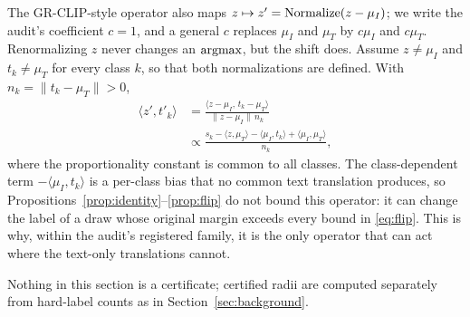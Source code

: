 \begin{remark}
\label{rem:twosided}
The GR-CLIP-style operator also maps $z\mapsto z'=\operatorname{Normalize}(z-\mu_I)$; we write the
audit's coefficient $c=1$, and a general $c$ replaces $\mu_I$ and $\mu_T$ by $c\mu_I$ and $c\mu_T$.
Renormalizing $z$ never changes an $\operatorname{argmax}$, but the shift does. Assume
$z\neq\mu_I$ and $t_k\neq\mu_T$ for every class $k$, so that both
normalizations are defined. With $n_k=\lVert t_k-\mu_T\rVert>0$,
\begin{align}
\langle z',t'_k\rangle
&=\frac{\langle z-\mu_I,\,t_k-\mu_T\rangle}{\lVert z-\mu_I\rVert\,n_k}
\nonumber\\
&\propto
\frac{s_k-\langle z,\mu_T\rangle-\langle\mu_I,t_k\rangle+\langle\mu_I,\mu_T\rangle}{n_k},
\label{eq:twosided}
\end{align}
where the proportionality constant is common to all classes. The
class-dependent term $-\langle\mu_I,t_k\rangle$ is a per-class bias that no
common text translation produces, so
Propositions~\ref{prop:identity}--\ref{prop:flip} do not bound this operator:
it can change the label of a draw whose original margin exceeds every bound in
\eqref{eq:flip}. This is why, within the audit's registered family, it is the only operator
that can act where the text-only translations cannot.
\end{remark}

\begin{remark}
Nothing in this section is a certificate; certified radii are computed
separately from hard-label counts as in Section~\ref{sec:background}.
\end{remark}
